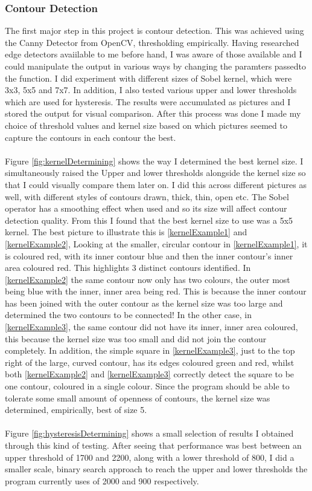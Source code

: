 \documentclass[11pt]{article}
\begin{document}
\subsubsection{Contour Detection}
The first major step in this project is contour detection. This was achieved
using the Canny Detector from OpenCV, thresholding empirically. Having
researched edge detectors avaiilable to me before hand, I was aware of those
available and I could manipulate the output in various ways by
changing the paramters passedto the function. I did experiment with different
sizes of Sobel kernel, which were 3x3, 5x5 and 7x7. In addition, I also
tested various upper and lower thresholds which are used for hysteresis. The
results were accumulated as pictures and I stored the output for visual
comparison. After this process was done I made my choice of threshold values
and kernel size based on which pictures seemed to capture the contours
in each contour the best. \\
\\
Figure \ref{fig:kernelDetermining} shows the way I determined the best kernel
size. I simultaneously raised the Upper and lower thresholds alongside the 
kernel size so that I could visually compare them later on. I did this
across different pictures as well, with different styles of contours drawn,
thick, thin, open etc. The Sobel operator has a smoothing effect when
used and so its size will affect contour detection quality.
From this I found that the best kernel size to use was
a 5x5 kernel. The best picture to illustrate this is \ref{kernelExample1} 
and \ref{kernelExample2}, Looking at the smaller, circular contour in
\ref{kernelExample1}, it is coloured red, with its inner contour
blue and then the inner contour's inner area coloured red. This highlights
3 distinct contours identified. In \ref{kernelExample2} the same contour
now only has two colours, the outer most being blue with the inner, inner
area being red. This is because the inner contour has been joined with the
outer contour as the kernel size was too large and determined the two
contours to be connected! In the other case, in \ref{kernelExample3}, the
same contour did not have its inner, inner area coloured, this  because the
kernel size was too small and did not join the contour completely. In 
addition, the simple square in \ref{kernelExample3}, just to the top right of
the large, curved contour, has its edges coloured green
and red, whilst both \ref{kernelExample2} and \ref{kernelExample3} correctly
detect the square to be one contour, coloured in a single colour. Since
the program should be able to tolerate some small amount of openness of
contours, the kernel size was determined, empirically, best of size 5.\\
\\
Figure \ref{fig:hysteresisDetermining} shows a
small selection of results I obtained through this kind of testing. After
seeing that performance was best between an upper threshold of 1700 and 2200,
along with a lower threshold of 800, I did a smaller scale, binary search
approach to reach the upper and lower thresholds the program currently uses
of 2000 and 900 respectively.
\end{document}
